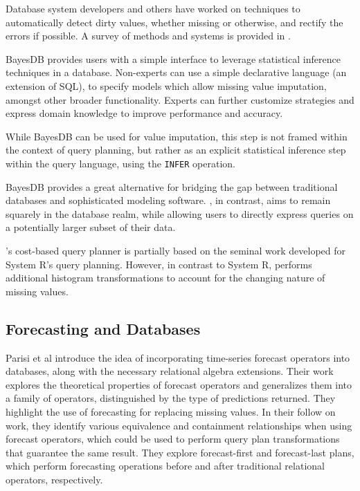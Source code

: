 Database system developers and others have worked on techniques to automatically
detect dirty values, whether missing or otherwise, and rectify the errors if
possible. A survey of methods and systems is provided in
\cite{hellerstein2008quantitative}.

BayesDB \cite{mansinghka2015bayesdb} provides users with a simple interface to 
leverage statistical inference techniques in a database. Non-experts
can use a simple declarative language (an extension of SQL), to specify models
which allow missing value imputation, amongst other broader functionality.
Experts can further customize strategies and express domain knowledge to
improve performance and accuracy.

While BayesDB can be used for value imputation, this step is not framed
within the context of query planning, but rather as an explicit statistical
inference step within the query language, using the \verb|INFER| operation. 

BayesDB provides a great alternative for bridging the gap between
traditional databases and sophisticated modeling software. \ProjectName{}, in
contrast, aims to remain squarely in the database realm, while allowing
users to directly express queries on a potentially larger subset of their data.

\ProjectName's cost-based query planner 
is partially based on the seminal work developed for System R's query planning\cite{blasgen1981system}.
However, in contrast to System R, \ProjectName{} performs additional histogram transformations to account
for the changing nature of missing values.

\subsection{Forecasting and Databases}
Parisi et al\cite{parisi2011embedding} introduce the idea of incorporating time-series forecast operators into
databases, along with the necessary relational algebra extensions. Their work explores the theoretical
properties of forecast operators and generalizes them into a family of operators, distinguished by
the type of predictions returned. They highlight the use of forecasting for replacing missing values.
In their follow on work\cite{parisi2013temporal}, they identify various equivalence and containment
relationships when using forecast operators, which could be used to perform query plan transformations that guarantee the same result. They
explore forecast-first and forecast-last plans, which perform forecasting operations before and after traditional
relational operators, respectively.

